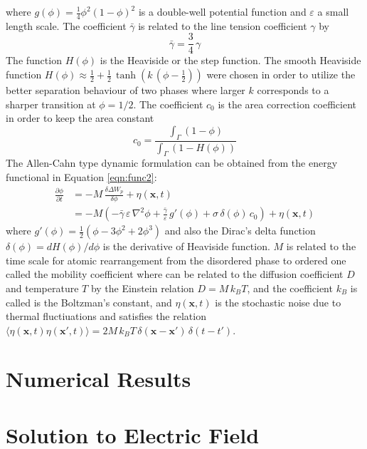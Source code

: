 \documentclass[english,12pt]{article}
\begin{document}
where $g(\phi)=\frac{1}{4}\phi^2(1-\phi)^2$ is a double-well potential function and $\varepsilon$ a small length scale. The coefficient $\bar{\gamma}$ is related to the line tension coefficient $\gamma$ by
\begin{equation}
	\bar{\gamma}=\frac{3}{4}\,\gamma
	\label{eqn:tensioncoeff}
\end{equation}
The function $H(\phi)$ is the Heaviside or the step function. The smooth Heaviside function $H(\phi)\approx\frac{1}{2}+\frac{1}{2}\,\tanh\left(k\,(\phi-\frac{1}{2})\right)$ were chosen in order to utilize the better separation behaviour of two phases where larger $k$ corresponds to a sharper transition at $\phi=1/2$. The coefficient $c_0$ is the area correction coefficient in order to keep the area constant
\begin{equation}
	c_0=\frac{\int_\Gamma(1-\phi)}{\int_{\Gamma}\left(1-H(\phi)\right)}
\end{equation}
The Allen-Cahn type dynamic formulation can be obtained from the energy functional in Equation \ref{eqn:func2}:
\begin{align}
		\frac{\partial\phi}{\partial t}&=-M\,\frac{\delta\Delta W_p}{\delta\phi}+\eta(\mathbf{x},t)\\
		&=-M\left(-\bar{\gamma}\,\varepsilon\,\nabla^2\phi+\frac{\bar{\gamma}}{\varepsilon}\,g'(\phi)  + \sigma\,\delta(\phi)\,c_0\right)+\eta(\mathbf{x},t)
\end{align}
where $g'(\phi)=\frac{1}{2}\left(\phi-3\phi^2+2\phi^3\right)$ and also the Dirac's delta function $\delta(\phi)=dH(\phi)/d\phi$ is the derivative of Heaviside function. $M$ is related to the time scale for atomic rearrangement from the disordered phase to ordered one called the mobility coefficient where can be related to the diffusion coefficient $D$ and temperature $T$ by the Einstein relation $D=M\,k_B T$, and the coefficient $k_B$ is called is the Boltzman's constant, and $\eta(\mathbf{x},t)$ is the stochastic noise due to thermal fluctiuations and satisfies the relation $\langle\eta(\mathbf{x},t)\eta(\mathbf{x'},t)\rangle=2M\,k_B T\,\delta(\mathbf{x}-\mathbf{x'})\,\delta(t-t')$.
\section{Numerical Results}
\newpage
\appendix
\section{Solution to Electric Field}

\newpage


\end{document}
